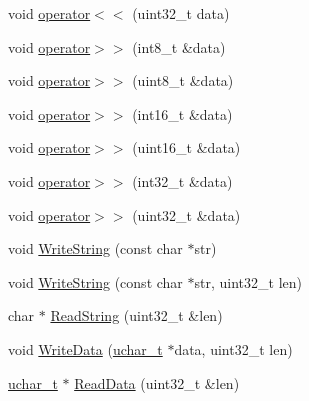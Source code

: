 \begin{DoxyCompactItemize}
\item 
void \hyperlink{class_c_byte_stream_a0e4abff6e8390566bf8aa0970c524f51}{operator$<$$<$} (uint32\+\_\+t data)
\item 
void \hyperlink{class_c_byte_stream_aaafd2d4d741c676f47c845c0b9c11bef}{operator$>$$>$} (int8\+\_\+t \&data)
\item 
void \hyperlink{class_c_byte_stream_ac9fd5cf462e67a9498441d7960cfc94f}{operator$>$$>$} (uint8\+\_\+t \&data)
\item 
void \hyperlink{class_c_byte_stream_acf8b6f979ed7698bbb725e36e09d3298}{operator$>$$>$} (int16\+\_\+t \&data)
\item 
void \hyperlink{class_c_byte_stream_a999212d0156d529c1354af8a098301c4}{operator$>$$>$} (uint16\+\_\+t \&data)
\item 
void \hyperlink{class_c_byte_stream_a4379f582d40e9d9bd2582487bb9cafb0}{operator$>$$>$} (int32\+\_\+t \&data)
\item 
void \hyperlink{class_c_byte_stream_af3e370bc60f5e370151aedeae69da723}{operator$>$$>$} (uint32\+\_\+t \&data)
\item 
void \hyperlink{class_c_byte_stream_adbbd864090727a1d0b0d12ef3d997bd8}{Write\+String} (const char $\ast$str)
\item 
void \hyperlink{class_c_byte_stream_a1fd03092402ffe575e4afc2ff291db8c}{Write\+String} (const char $\ast$str, uint32\+\_\+t len)
\item 
char $\ast$ \hyperlink{class_c_byte_stream_a09fabc2d3485b91956aabef178ce5894}{Read\+String} (uint32\+\_\+t \&len)
\item 
void \hyperlink{class_c_byte_stream_a1855fc9cd4ef3504a2235514eb292c8e}{Write\+Data} (\hyperlink{base_2ostype_8h_a124ea0f8f4a23a0a286b5582137f0b8d}{uchar\+\_\+t} $\ast$data, uint32\+\_\+t len)
\item 
\hyperlink{base_2ostype_8h_a124ea0f8f4a23a0a286b5582137f0b8d}{uchar\+\_\+t} $\ast$ \hyperlink{class_c_byte_stream_a06d6638c9b1784f22de93d011a553d4a}{Read\+Data} (uint32\+\_\+t \&len)
\end{DoxyCompactItemize}
